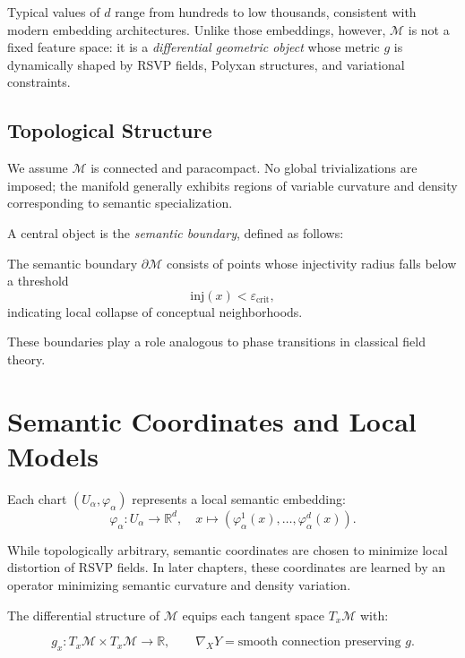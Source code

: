 Typical values of $d$ range from hundreds to low thousands, consistent with modern embedding architectures.  
Unlike those embeddings, however, $\mathcal{M}$ is not a fixed feature space: it is a \emph{differential geometric object} whose metric $g$ is dynamically shaped by RSVP fields, Polyxan structures, and variational constraints.

\subsection{Topological Structure}

We assume $\mathcal{M}$ is connected and paracompact.  
No global trivializations are imposed; the manifold generally exhibits regions of variable curvature and density corresponding to semantic specialization.

A central object is the \emph{semantic boundary}, defined as follows:

\begin{definition}
The semantic boundary $\partial\mathcal{M}$ consists of points whose injectivity radius falls below a threshold
\[
\mathrm{inj}(x) < \varepsilon_{\text{crit}},
\]
indicating local collapse of conceptual neighborhoods.
\end{definition}

These boundaries play a role analogous to phase transitions in classical field theory.

\section{Semantic Coordinates and Local Models}

Each chart $(U_\alpha, \varphi_\alpha)$ represents a local semantic embedding:
\[
\varphi_\alpha : U_\alpha \to \mathbb{R}^d,
\quad x \mapsto (\varphi_\alpha^1(x), \dots, \varphi_\alpha^d(x)).
\]

While topologically arbitrary, semantic coordinates are chosen to minimize local distortion of RSVP fields.  
In later chapters, these coordinates are learned by an operator minimizing semantic curvature and density variation.

The differential structure of $\mathcal{M}$ equips each tangent space $T_x\mathcal{M}$ with:

\[
g_x : T_x\mathcal{M}\times T_x\mathcal{M}\to \mathbb{R},
\qquad
\nabla_X Y = \text{smooth connection preserving }g.
\]

